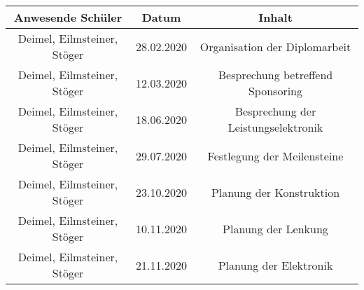 \begin{tabular}[h]{|c|c|c|}
    \hline
    \textbf{Anwesende Schüler} & \textbf{Datum}  & \textbf{Inhalt} \\
    \hline
    Deimel, Eilmsteiner, Stöger & 28.02.2020 & Organisation der Diplomarbeit \\
    \hline
    Deimel, Eilmsteiner, Stöger & 12.03.2020 & Besprechung betreffend Sponsoring \\
    \hline
    Deimel, Eilmsteiner, Stöger & 18.06.2020 & Besprechung der Leistungselektronik \\
    \hline
    Deimel, Eilmsteiner, Stöger & 29.07.2020 & Festlegung der Meilensteine \\
    \hline
    Deimel, Eilmsteiner, Stöger & 23.10.2020 & Planung der Konstruktion \\
    \hline
    Deimel, Eilmsteiner, Stöger & 10.11.2020 & Planung der Lenkung \\
    \hline 
    Deimel, Eilmsteiner, Stöger & 21.11.2020 & Planung der Elektronik \\
    \hline
\end{tabular}
